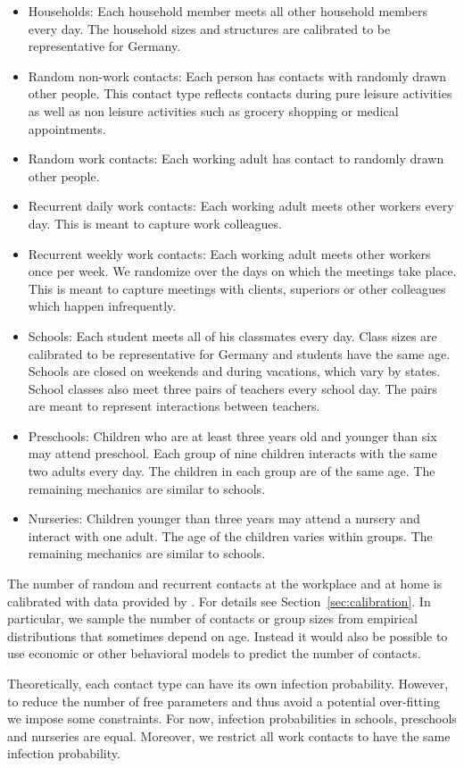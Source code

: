 \begin{itemize}
    \item Households: Each household member meets all other household members every day. The household sizes and structures are calibrated to be representative for Germany.

    \item Random non-work contacts: Each person has contacts with randomly drawn other people. This contact type reflects contacts during pure leisure activities as well as non leisure activities such as grocery shopping or medical appointments.

    \item Random work contacts: Each working adult has contact to randomly drawn other people.

    \item Recurrent daily work contacts: Each working adult meets other workers every day. This is meant to capture work colleagues.

    \item Recurrent weekly work contacts: Each working adult meets other workers once per week. We randomize over the days on which the meetings take place. This is meant to capture meetings with clients, superiors or other colleagues which happen infrequently.

    \item Schools: Each student meets all of his classmates every day. Class sizes are calibrated to be representative for Germany and students have the same age. Schools are closed on weekends and during vacations, which vary by states. School classes also meet three pairs of teachers every school day. The pairs are meant to represent interactions between teachers.

    \item Preschools: Children who are at least three years old and younger than six may attend preschool. Each group of nine children interacts with the same two adults every day. The children in each group are of the same age. The remaining mechanics are similar to schools.

    \item Nurseries: Children younger than three years may attend a nursery and interact with one adult. The age of the children varies within groups. The remaining mechanics are similar to schools.
\end{itemize}


The number of random and recurrent contacts at the workplace and at home is calibrated with data provided by \cite{Mossong2008}. For details see Section~\ref{sec:calibration}. In particular, we sample the number of contacts or group sizes from empirical distributions that sometimes depend on age. Instead it would also be possible to use economic or other behavioral models to predict the number of contacts.

Theoretically, each contact type can have its own infection probability. However, to reduce the number of free parameters and thus avoid a potential over-fitting we impose some constraints. For now, infection probabilities in schools, preschools and nurseries are equal. Moreover, we restrict all work contacts to have the same infection probability.
